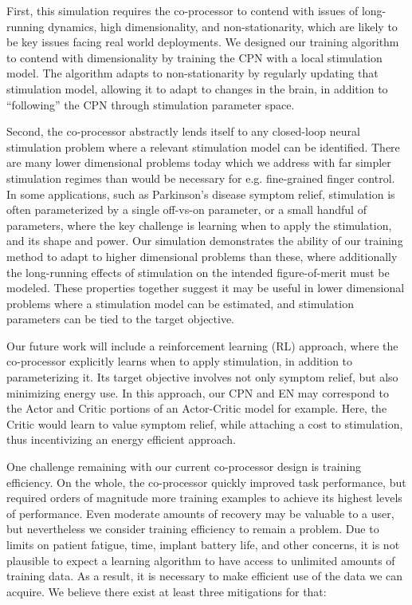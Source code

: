 \documentclass[12pt]{iopart}
\begin{document}
First, this simulation requires the co-processor to contend with issues of long-running
dynamics, high dimensionality, and non-stationarity, which are likely to be key issues
facing real world deployments. We designed our training algorithm to contend with dimensionality
by training the CPN with a local stimulation model. The algorithm adapts to non-stationarity by
regularly updating that stimulation model, allowing it to adapt to changes in the brain, in
addition to ``following'' the CPN through stimulation parameter space.

Second, the co-processor abstractly lends itself to any closed-loop neural stimulation problem
where a relevant stimulation model can be identified. There are many lower dimensional problems
today which we address with far simpler stimulation regimes than would be necessary for
e.g. fine-grained finger control. In some applications, such as Parkinson's disease symptom relief,
stimulation is often parameterized by a single off-vs-on parameter, or a small handful of
parameters, where the key challenge is learning when to apply the stimulation, and
its shape and power. Our simulation demonstrates the ability of our training method to
adapt to higher dimensional problems than these, where additionally the long-running
effects of stimulation on the intended figure-of-merit must be modeled. These properties
together suggest it may be useful in lower dimensional problems where a stimulation model
can be estimated, and stimulation parameters can be tied to the target objective.

Our future work will include a reinforcement learning (RL) approach, where the co-processor
explicitly learns when to apply stimulation, in addition to parameterizing it. Its target
objective involves not only symptom relief, but also minimizing energy use. In this approach,
our CPN and EN may correspond to the Actor and Critic portions of an Actor-Critic model
for example. Here, the Critic would learn to value symptom relief, while attaching a cost
to stimulation, thus incentivizing an energy efficient approach.

One challenge remaining with our current co-processor design is training efficiency.
On the whole, the co-processor quickly improved task performance, but required orders of
magnitude more training examples to achieve its highest levels of performance. Even
moderate amounts of recovery may be valuable to a user, but nevertheless we consider
training efficiency to remain a problem. Due to limits on patient fatigue, time, implant
battery life, and other concerns, it is not plausible to expect a learning algorithm
to have access to unlimited amounts of training data. As a result, it is necessary to
make efficient use of the data we can acquire. We believe there exist at least three
mitigations for that:
\end{document}
